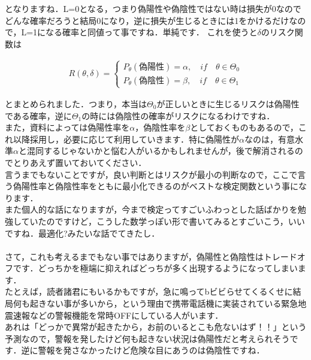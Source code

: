 \documentclass[11pt,a4paper]{ujreport} 	%
\begin{document}
となりますね．L=0となる，つまり偽陽性や偽陰性ではない時は損失が0なのでどんな確率だろうと結局0になり，逆に損失が生じるときには1をかけるだけなので，L=1になる確率と同値って事ですね．単純です．
これを使うと$\delta$のリスク関数は

\begin{align}
  R(\theta, \delta) = 
  \left\{
    \begin{array}{l}
    P_\theta(偽陽性)=\alpha, \quad if \quad \theta \in \Theta_0\\
    P_\theta(偽陰性)=\beta, \quad if \quad \theta \in \Theta_1
    \end{array}
  \right.
  \label{eq:risk}
\end{align}

とまとめられました．つまり，本当は$\Theta_0$が正しいときに生じるリスクは偽陽性である確率，逆に$\Theta_1$の時には偽陰性の確率がリスクになるわけですね．\\

また，資料によっては偽陽性率を$\alpha$，偽陰性率を$\beta$としておくものもあるので，これ以降採用し，必要に応じて利用していきます．特に偽陽性が$\alpha$なのは，有意水準$\alpha$と混同するじゃないかと悩む人がいるかもしれませんが，後で解消されるのでとりあえず置いておいてください．\\

言うまでもないことですが，良い判断とはリスクが最小の判断なので，ここで言う偽陽性率と偽陰性率をともに最小化できるのがベストな検定関数という事になります．\\

また個人的な話になりますが，今まで検定ってすごいふわっとした話ばかりを勉強していたのですけど，こうした数学っぽい形で書いてみるとすごいこう，いいですね．最適化?みたいな話でてきたし．\\\\

さて，これも考えるまでもない事ではありますが，偽陽性と偽陰性はトレードオフです．どっちかを極端に抑えればどっちが多く出現するようになってしまいます．\\

たとえば，読者諸君にもいるかもですが，急に鳴ってbビビらせてくるくせに結局何も起きない事が多いから，という理由で携帯電話機に実装されている緊急地震速報などの警報機能を常時OFFにしている人がいます．\\

あれは「どっかで異常が起きたから，お前のいるとこも危ないはず！！」という予測なので，警報を発したけど何も起きない状況は偽陽性だと考えられそうです．逆に警報を発さなかったけど危険な目にあうのは偽陰性ですね．\\
\end{document}
